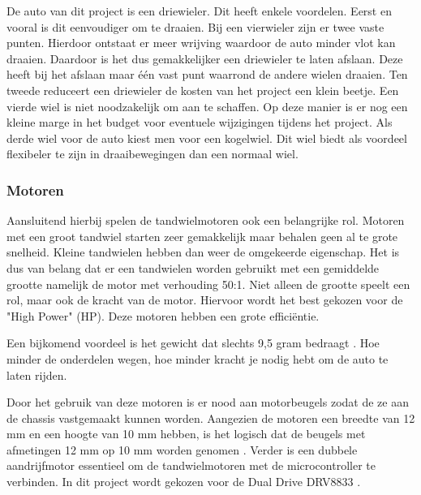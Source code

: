 \documentclass[a4paper,twoside,kulak]{kulakreport} %
\begin{document}
De auto van dit project is een driewieler. Dit heeft enkele voordelen. Eerst en vooral is dit eenvoudiger om te draaien. Bij een vierwieler zijn er twee vaste punten. Hierdoor ontstaat er meer wrijving waardoor de auto minder vlot kan draaien. Daardoor is het dus gemakkelijker een driewieler te laten afslaan. Deze heeft bij het afslaan maar één vast punt waarrond de andere wielen draaien. 
Ten tweede reduceert een driewieler de kosten van het project een klein beetje. Een vierde wiel is niet noodzakelijk om aan te schaffen. Op deze manier is er nog een kleine marge in het budget voor eventuele wijzigingen tijdens het project. Als derde wiel voor de auto kiest men voor een kogelwiel. Dit wiel biedt als voordeel flexibeler te zijn in draaibewegingen dan een normaal wiel.  
\label{Wielen}


\subsubsection{Motoren}
Aansluitend hierbij spelen de tandwielmotoren ook een belangrijke rol. Motoren met een groot tandwiel starten zeer gemakkelijk maar behalen geen al te grote snelheid. Kleine tandwielen hebben dan weer de omgekeerde eigenschap. Het is dus van belang dat er een tandwielen worden gebruikt met een gemiddelde grootte namelijk de motor met verhouding 50:1. Niet alleen de grootte speelt een rol, maar ook de kracht van de motor. Hiervoor wordt het best gekozen voor de "High Power" (HP). Deze motoren hebben een grote efficiëntie. 

Een bijkomend voordeel is het gewicht dat slechts 9,5 gram bedraagt \cite{MicroMetalGearMotor50:1HP}. %
Hoe minder de onderdelen wegen, hoe minder kracht je nodig hebt om de auto te laten rijden. 

Door het gebruik van deze motoren is er nood aan motorbeugels zodat de ze aan de chassis  vastgemaakt kunnen worden. Aangezien de motoren een breedte van 12 mm en een hoogte van 10 mm hebben, is het logisch dat de beugels met afmetingen 12 mm op 10 mm worden genomen \cite{MicroMetalGearMotorBeugel}.
Verder is een dubbele aandrijfmotor essentieel om de tandwielmotoren met de microcontroller te verbinden. In dit project wordt gekozen voor de Dual Drive DRV8833 \cite{DualDriveDRV8833}. 
\label{Motoren}
\end{document}

